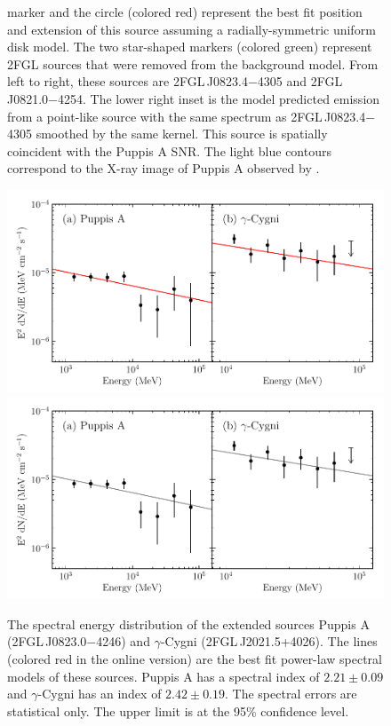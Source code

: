 \begin{figure}
{  marker and the circle (colored
  red) represent 
  the best fit position and extension of this source assuming a
  radially-symmetric uniform disk model.  The two 
  star-shaped markers (colored
  green) represent 2FGL sources that were
  removed from the background model.
  From left to right, these sources are 2FGL\,J0823.4$-$4305 and 2FGL\,J0821.0$-$4254.
  The lower right inset is the model predicted emission from a point-like
  source with the same spectrum as 2FGL\,J0823.4$-$4305 smoothed by the
  same kernel.  This source is spatially coincident with the Puppis A
  SNR. The light blue contours correspond to the X-ray image of Puppis
  A observed by \rosat \citep{petre_1996a_central-stellar}.
  }
\end{figure}

\clearpage
\begin{figure}
    \ifcolorfigure
      \includegraphics{summary_plots/snr_seds_color.pdf}
    \else
      \includegraphics{summary_plots/snr_seds_bw.pdf}
    \fi
    \caption{
    The spectral energy distribution of the extended sources 
    Puppis A (2FGL\,J0823.0$-$4246) and $\gamma$-Cygni 
    (2FGL\,J2021.5+4026).
    The lines (colored red in the online version)
    are the best fit power-law spectral models of
    these sources. Puppis A has a spectral index of
    $2.21\pm0.09$ and $\gamma$-Cygni has an
    index of $2.42\pm0.19$.
    The spectral errors are statistical only.
    The upper limit is at the 95\% confidence level.
    }
  \end{figure}




